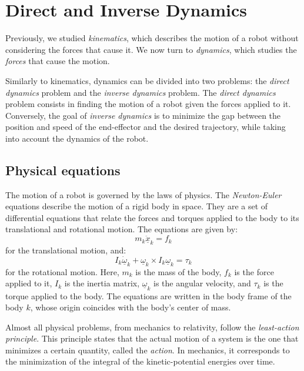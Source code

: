 \section{Direct and Inverse Dynamics}
Previously, we studied \emph{kinematics}, which describes the motion of a robot without considering the forces that cause it. We now turn to \emph{dynamics}, which studies the \emph{forces} that cause the motion. 

Similarly to kinematics, dynamics can be divided into two problems: the \emph{direct dynamics} problem and the \emph{inverse dynamics} problem. The \emph{direct dynamics} problem consists in finding the motion of a robot given the forces applied to it. Conversely, the goal of \emph{inverse dynamics} is to minimize the gap between the position and speed of the end-effector and the desired trajectory, while taking into account the dynamics of the robot.

\subsection{Physical equations}
The motion of a robot is governed by the laws of physics. The \emph{Newton-Euler} equations describe the motion of a rigid body in space. They are a set of differential equations that relate the forces and torques applied to the body to its translational and rotational motion. The equations are given by:
\begin{equation}
    \tag{Newton's equation}
    m_k\underline{\ddot{x}}_k = f_k
\end{equation}
for the translational motion, and:
\begin{equation}
    \tag{Euler's equation}
    I_k\underline{\dot{\omega}}_k + \underline{\omega}_k\times I_k\underline{\omega}_k = \tau_k
\end{equation}
for the rotational motion. Here, $m_k$ is the mass of the body, $f_k$ is the force applied to it, $I_k$ is the inertia matrix, $\underline{\omega}_k$ is the angular velocity, and $\tau_k$ is the torque applied to the body. The equations are written in the body frame of the body $k$, whose origin coincides with the body's center of mass.

Almost all physical problems, from mechanics to relativity, follow the \emph{least-action principle}. This principle states that the actual motion of a system is the one that minimizes a certain quantity, called the \emph{action}. In mechanics, it corresponds to the minimization of the integral of the kinetic-potential energies over time.

